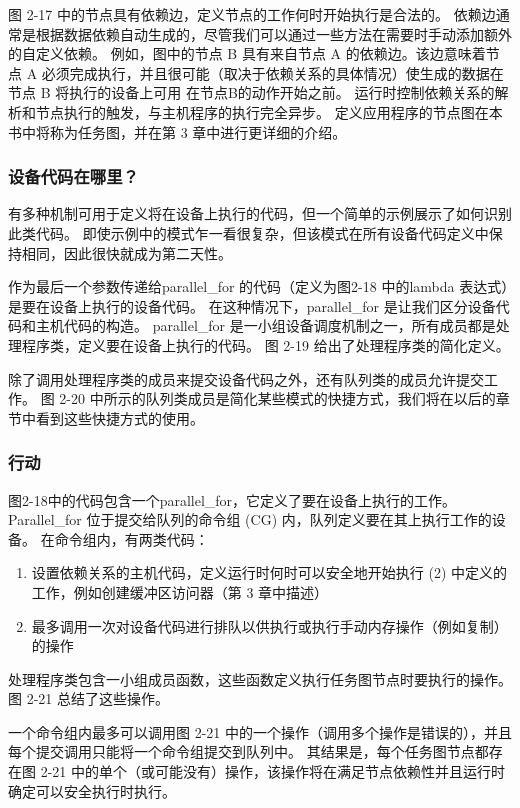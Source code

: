 图 2-17 中的节点具有依赖边，定义节点的工作何时开始执行是合法的。 依赖边通常是根据数据依赖自动生成的，尽管我们可以通过一些方法在需要时手动添加额外的自定义依赖。 例如，图中的节点 B 具有来自节点 A 的依赖边。该边意味着节点 A 必须完成执行，并且很可能（取决于依赖关系的具体情况）使生成的数据在节点 B 将执行的设备上可用 在节点B的动作开始之前。 运行时控制依赖关系的解析和节点执行的触发，与主机程序的执行完全异步。 定义应用程序的节点图在本书中将称为任务图，并在第 3 章中进行更详细的介绍。

\subsubsection{设备代码在哪里？}
有多种机制可用于定义将在设备上执行的代码，但一个简单的示例展示了如何识别此类代码。 即使示例中的模式乍一看很复杂，但该模式在所有设备代码定义中保持相同，因此很快就成为第二天性。

作为最后一个参数传递给parallel\_for 的代码（定义为图2-18 中的lambda 表达式）是要在设备上执行的设备代码。 在这种情况下，parallel\_for 是让我们区分设备代码和主机代码的构造。 parallel\_for 是一小组设备调度机制之一，所有成员都是处理程序类，定义要在设备上执行的代码。 图 2-19 给出了处理程序类的简化定义。

除了调用处理程序类的成员来提交设备代码之外，还有队列类的成员允许提交工作。 图 2-20 中所示的队列类成员是简化某些模式的快捷方式，我们将在以后的章节中看到这些快捷方式的使用。

\subsubsection{行动}
图2-18中的代码包含一个parallel\_for，它定义了要在设备上执行的工作。 Parallel\_for 位于提交给队列的命令组 (CG) 内，队列定义要在其上执行工作的设备。 在命令组内，有两类代码：

\begin{enumerate}
	\item 设置依赖关系的主机代码，定义运行时何时可以安全地开始执行 (2) 中定义的工作，例如创建缓冲区访问器（第 3 章中描述）

	\item 最多调用一次对设备代码进行排队以供执行或执行手动内存操作（例如复制）的操作
\end{enumerate}

处理程序类包含一小组成员函数，这些函数定义执行任务图节点时要执行的操作。 图 2-21 总结了这些操作。

一个命令组内最多可以调用图 2-21 中的一个操作（调用多个操作是错误的），并且每个提交调用只能将一个命令组提交到队列中。 其结果是，每个任务图节点都存在图 2-21 中的单个（或可能没有）操作，该操作将在满足节点依赖性并且运行时确定可以安全执行时执行。

